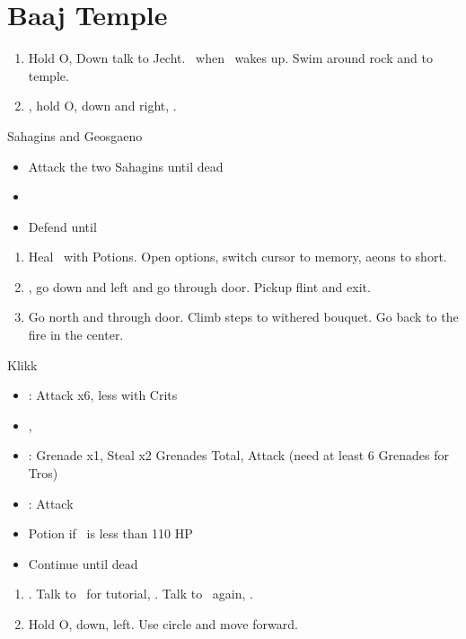 \chapter{Baaj Temple}\label{ch:baaj-temple}

\begin{enumerate}
	\item Hold O, Down talk to Jecht. \sd \ when \tidus \ wakes up. Swim around rock and to temple.
	\item \cs, hold O, down and right, \cs.
\end{enumerate}
\begin{battle}{Sahagins and Geosgaeno}
	\begin{itemize}
		\item Attack the two Sahagins until dead
		\item \cs[0:30]
		\item Defend until \cs
	\end{itemize}
\end{battle}
\begin{enumerate}[resume]
	\item Heal \tidus \ with Potions. Open options, switch cursor to memory, aeons to short.
	\item \cs, go down and left and go through door. Pickup flint and exit.
	\item Go north and through door. Climb steps to withered bouquet. Go back to the fire in the center. \cs[2:10]
\end{enumerate}
\begin{battle}[1500]{Klikk}
	\begin{itemize}
		\item \tidus: Attack x6, less with Crits
		\item \cs, \sd
		\item \rikku: Grenade x1, Steal x2 Grenades Total, Attack (need at least 6 Grenades for Tros)
		\item \tidus: Attack
		\item Potion if \tidus \ is less than 110 HP
		\item Continue until dead
	\end{itemize}
\end{battle}
\begin{enumerate}[resume]
	\item \cs[2:30]. Talk to \rikku \ for tutorial, \sd. Talk to \rikku \ again, \sd.
	\item Hold O, down, left. Use circle and move forward.
\end{enumerate}
